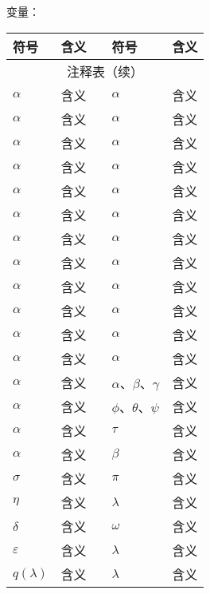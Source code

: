 

	{\raggedright\heiti{}变量：}

	\begin{longtable}{p{2cm} p{4cm} p{1cm} p{2cm} p{4cm}} %
		\toprule
		\textbf{符号} & \textbf{含义} && \textbf{符号} &\textbf{含义} \\ 
		\midrule 
		\endfirsthead 
		
		\multicolumn{5}{c}{{\heiti\zihao{-3}注释表（续）}} \\ 
		\endhead
		
		\bottomrule
		\endlastfoot
		
		$\alpha$ & 含义	&& $\alpha$ & 含义 \\ 
		$\alpha$ & 含义			&& $\alpha$ & 含义\\ 
		$\alpha$& 含义			&&$\alpha$ & 含义 \\
		$\alpha$ & 含义	 &&$\alpha$ & 含义 \\
		$\alpha$&  含义	 && $\alpha$ & 含义 \\
		$\alpha$ & 含义	 &&$\alpha$ & 含义\\
		$\alpha$ & 含义	 &&$\alpha$ & 含义\\
		$\alpha$ & 含义	 	 &&	$\alpha$ & 含义\\
 		$\alpha$ & 含义 &&$\alpha$ & 含义\\
		$\alpha$ & 含义	&& $\alpha$ & 含义	\\
		$\alpha$ & 含义	 &&$\alpha$ & 含义\\
		$\alpha$ & 含义	 &&$\alpha$ & 含义\\
		$\alpha$ &含义	 &&$\alpha$、$\beta$、$\gamma$ & 含义\\
		$\alpha$ & 含义	 &&$\phi$、$\theta$、$\psi$ & 含义\\
	 	$\alpha$	 & 含义 		&&$\tau$ & 含义\\

		$\alpha$ & 含义 &&$\beta$ & 含义\\
		$\sigma$ & 含义	 &&$\pi$ & 含义\\
		$\eta$ & 含义	 &&$\lambda$ & 含义\\
		$\delta$ & 含义	 &&$\omega$ & 含义\\
		$\varepsilon$ & 含义	&&$\lambda$& 含义\\
		$q(\lambda)$& 含义	 &&$\lambda$& 含义\\
	\end{longtable}

